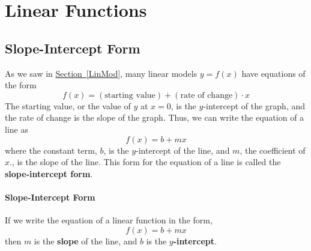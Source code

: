 \documentclass[10pt,]{book}
\newcommand{\terminology}[1]{\textbf{#1}}
\theoremstyle{plain}
\theoremstyle{definition}
\theoremstyle{definition}
\numberwithin{equation}{section}
\begin{document}
\section[Linear Functions]{Linear Functions}\label{linear-functions}
\typeout{************************************************}
\typeout{************************************************}
\subsection[Slope-Intercept Form]{Slope-Intercept Form}\label{subsection-24}

    As we saw in \hyperref[LinMod]{Section~\ref{LinMod}}, many linear models \(y = f (x)\) have equations of the form
    \begin{equation*}f (x) = (\text{starting value}) + (\text{rate of change}) \cdot x\end{equation*}
    The starting value, or the value of \(y\) at \(x = 0\), is the \(y\)-intercept of the graph, and the rate of change is the slope of the graph. Thus, we can write the equation of a line as
    \begin{equation*}f (x) = b + mx\end{equation*}
    where the constant term, \(b\), is the \(y\)-intercept of the line, and \(m\), the coefficient of \(x\)., is the slope of the line. This form for the equation of a line is called the \terminology{slope-intercept form}.
%
\typeout{************************************************}
\typeout{************************************************}
\paragraph[Slope-Intercept Form]{Slope-Intercept Form}\label{paragraphs-14}

        If we write the equation of a linear function in the form,
        \begin{equation*}f (x) = b + mx\end{equation*}
        then \(m\) is the \terminology{slope} of the line, and \(b\) is the \terminology{\(y\)-intercept}.
\par
\end{document}
